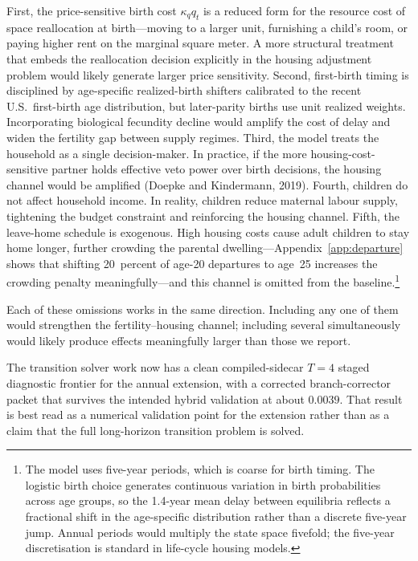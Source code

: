 \documentclass[11pt]{article}
\begin{document}
First, the price-sensitive birth cost $\kappa_q q_t$ is a reduced form for the resource cost
of space reallocation at birth---moving to a larger unit, furnishing a child's room, or
paying higher rent on the marginal square meter. A more structural treatment that embeds the
reallocation decision explicitly in the housing adjustment problem would likely generate
larger price sensitivity. Second, first-birth timing is disciplined by age-specific
realized-birth shifters calibrated to the recent U.S.\ first-birth age distribution, but
later-parity births use unit realized weights. Incorporating biological fecundity decline
would amplify the cost of delay and widen the fertility gap between supply regimes. Third,
the model treats the household as a single decision-maker. In practice, if the more
housing-cost-sensitive partner holds effective veto power over birth decisions, the housing
channel would be amplified (Doepke and Kindermann, 2019). Fourth, children do not affect
household income. In reality, children reduce maternal labour supply, tightening the budget
constraint and reinforcing the housing channel. Fifth, the leave-home schedule is exogenous.
High housing costs cause adult children to stay home longer, further crowding the parental
dwelling---Appendix~\ref{app:departure} shows that shifting 20~percent of age-20 departures
to age~25 increases the crowding penalty meaningfully---and this channel is omitted from the
baseline.\footnote{The model uses five-year periods, which is coarse for birth timing. The
logistic birth choice generates continuous variation in birth probabilities across age groups,
so the 1.4-year mean delay between equilibria reflects a fractional shift in the age-specific
distribution rather than a discrete five-year jump. Annual periods would multiply the state
space fivefold; the five-year discretisation is standard in life-cycle housing models.}

Each of these omissions works in the same direction. Including any one of them would
strengthen the fertility--housing channel; including several simultaneously would likely
produce effects meaningfully larger than those we report.

The transition solver work now has a clean compiled-sidecar $T=4$ staged diagnostic frontier
for the annual extension, with a corrected branch-corrector packet that survives the intended
hybrid validation at about $0.0039$. That result is best read as a numerical validation point
for the extension rather than as a claim that the full long-horizon transition problem is
solved.
\end{document}
